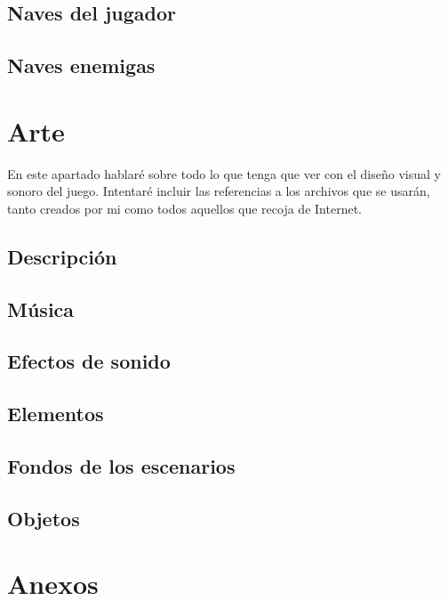 \documentclass[12pt, spanish, a4paper]{article}
\begin{document}
	\lipsum[18]
	
	\subsection{Naves del jugador}
	
	\lipsum[19]
	
	\subsection{Naves enemigas}
	
	\lipsum[20]
	
	\section{Arte}
	
	En este apartado hablaré sobre todo lo que tenga que ver con el diseño visual y sonoro del juego. Intentaré incluir las referencias a los archivos que se usarán, tanto creados por mi como todos aquellos que recoja de Internet.
	
	\subsection{Descripción}
	
	\lipsum[22]
	
	\subsection{Música}
	
	\lipsum[23]
	
	\subsection{Efectos de sonido}
	
	\lipsum[24]
	
	\subsection{Elementos}
	
	\lipsum[25]
	
	\subsection{Fondos de los escenarios}
	
	\lipsum[26]
	
	\subsection{Objetos}
	
	\lipsum[27]
	
	\section{Anexos}
	
\end{document}
